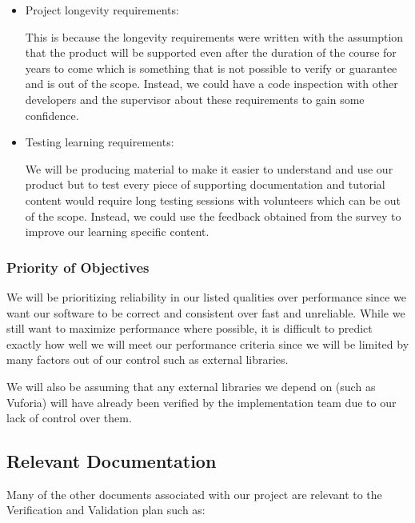 \documentclass[12pt, titlepage]{article}
\begin{document}
\begin{itemize}
    \item  Project longevity requirements:

    This is because the longevity requirements were written with the assumption that the product will be supported even after the duration of the course for years to come which is something that is not possible to verify or guarantee and is out of the scope. Instead, we could have a code inspection with other developers and the supervisor about these requirements to gain some confidence.

    \item  Testing learning requirements:

    We will be producing material to make it easier to understand and use our product but to test every piece of supporting documentation and tutorial content would require long testing sessions with volunteers which can be out of the scope. Instead, we could use the feedback obtained from the survey to improve our learning specific content.
    
\end{itemize}


\subsubsection{Priority of Objectives}
We will be prioritizing reliability in our listed qualities over performance since we want our software to be correct and consistent over fast and unreliable. While we still want to maximize performance where possible, it is difficult to predict exactly how well we will meet our performance criteria since we will be limited by many factors out of our control such as external libraries.

We will also be assuming that any external libraries we depend on (such as Vuforia) will have already been verified by the implementation team due to our lack of control over them. 


\subsection{Relevant Documentation}

Many of the other documents associated with our project are relevant to the Verification and Validation plan such as:
\end{document}
